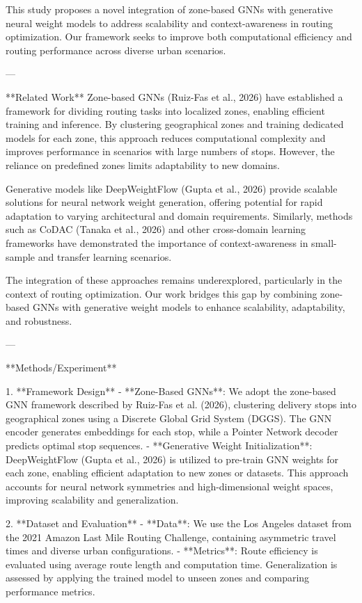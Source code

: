 This study proposes a novel integration of zone-based GNNs with generative neural weight models to address scalability and context-awareness in routing optimization. Our framework seeks to improve both computational efficiency and routing performance across diverse urban scenarios.

---

**Related Work**  
Zone-based GNNs (Ruiz-Fas et al., 2026) have established a framework for dividing routing tasks into localized zones, enabling efficient training and inference. By clustering geographical zones and training dedicated models for each zone, this approach reduces computational complexity and improves performance in scenarios with large numbers of stops. However, the reliance on predefined zones limits adaptability to new domains.

Generative models like DeepWeightFlow (Gupta et al., 2026) provide scalable solutions for neural network weight generation, offering potential for rapid adaptation to varying architectural and domain requirements. Similarly, methods such as CoDAC (Tanaka et al., 2026) and other cross-domain learning frameworks have demonstrated the importance of context-awareness in small-sample and transfer learning scenarios.

The integration of these approaches remains underexplored, particularly in the context of routing optimization. Our work bridges this gap by combining zone-based GNNs with generative weight models to enhance scalability, adaptability, and robustness.

---

**Methods/Experiment**  

1. **Framework Design**  
   - **Zone-Based GNNs**: We adopt the zone-based GNN framework described by Ruiz-Fas et al. (2026), clustering delivery stops into geographical zones using a Discrete Global Grid System (DGGS). The GNN encoder generates embeddings for each stop, while a Pointer Network decoder predicts optimal stop sequences.
   - **Generative Weight Initialization**: DeepWeightFlow (Gupta et al., 2026) is utilized to pre-train GNN weights for each zone, enabling efficient adaptation to new zones or datasets. This approach accounts for neural network symmetries and high-dimensional weight spaces, improving scalability and generalization.

2. **Dataset and Evaluation**  
   - **Data**: We use the Los Angeles dataset from the 2021 Amazon Last Mile Routing Challenge, containing asymmetric travel times and diverse urban configurations.
   - **Metrics**: Route efficiency is evaluated using average route length and computation time. Generalization is assessed by applying the trained model to unseen zones and comparing performance metrics.

